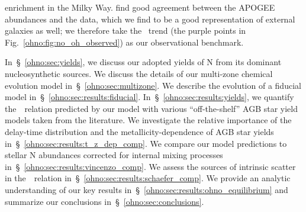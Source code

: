 enrichment in the Milky Way.
\citet{Vincenzo2021b} find good agreement between the APOGEE abundances and the
\citet{Dopita2016} data, which we find to be a good representation of external
galaxies as well; we therefore take the~\citet{Dopita2016} trend (the purple
points in Fig.~\ref{ohno:fig:no_oh_observed}) as our observational benchmark.
\par
In~\S~\ref{ohno:sec:yields}, we discuss our adopted yields of N from its dominant
nucleosynthetic sources.
We discuss the details of our multi-zone chemical evolution model
in~\S~\ref{ohno:sec:multizone}.
We describe the evolution of a fiducial model in~\S~\ref{ohno:sec:results:fiducial}.
In~\S~\ref{ohno:sec:results:yields}, we quantify the~\ohno~relation predicted by our
model with various ``off-the-shelf'' AGB star yield models taken from the
literature.
We investigate the relative importance of the delay-time distribution and the
metallicity-dependence of AGB star yields in~\S~\ref{ohno:sec:results:t_z_dep_comp}.
We compare our model predictions to stellar N abundances corrected for internal
mixing processes in~\S~\ref{ohno:sec:results:vincenzo_comp}.
We assess the sources of intrinsic scatter in the~\ohno~relation
in~\S~\ref{ohno:sec:results:schaefer_comp}.
We provide an analytic understanding of our key results
in~\S~\ref{ohno:sec:results:ohno_equilibrium} and summarize our conclusions
in~\S~\ref{ohno:sec:conclusions}.

